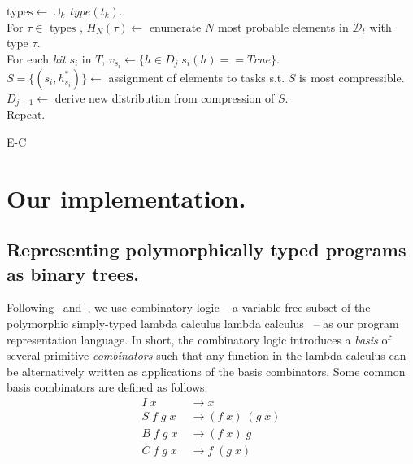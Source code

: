\documentclass{article}
\begin{document}
  \begin{algorithm}
    \SetAlgoLined {}  

    $\text{types} \leftarrow \cup_k \, type(t_k)$. \\
    For $\tau \in \text{ types}$ , $H_N(\tau) \leftarrow$ enumerate
    $N$ most probable elements in $\mathcal{D}_t$ with type $\tau$.\\

    For each \emph{hit} $s_i$ in 
    $T$, $v_{s_i} \leftarrow \{h \in D_j | s_i(h) == True \}$.\\

    $S = \{(s_i, h^*_{s_i})\} \leftarrow$ assignment of elements to tasks s.t. 
    $S$ is most compressible. \\

    $D_{j+1} \leftarrow$ derive new distribution from compression of $S$. \\

    Repeat. 

    \caption{E-C}
  \end{algorithm}



\section{Our implementation.}

\subsection{Representing polymorphically typed programs as binary trees.}

Following~\cite{liang10programs} and~\cite{Briggs:2008}, we use
combinatory logic -- a variable-free subset of the polymorphic
simply-typed lambda calculus lambda calculus~\cite{Pierce_2002} -- as
our program representation language. In short, the combinatory logic
introduces a \emph{basis} of several primitive \emph{combinators} such
that any function in the lambda calculus can be alternatively written
as applications of the basis combinators. Some common basis
combinators are defined as follows:
\begin{align}
I\; x &\rightarrow  x \\
S\; f\; g\; x\; &\rightarrow (f\; x)\; (g\; x) \\ 
B\; f\; g\; x\; &\rightarrow (f\; x)\; g \\ 
C\; f\; g\; x\; &\rightarrow f\; (g\; x) \\ 
\end{align}
\end{document}
